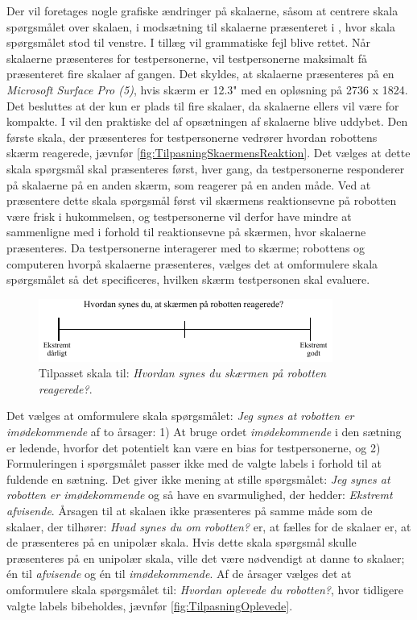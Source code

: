 Der vil foretages nogle grafiske ændringer på skalaerne, såsom at centrere skala spørgsmålet over skalaen, i modsætning til skalaerne præsenteret i , hvor skala spørgsmålet stod til venstre. I tillæg vil grammatiske fejl blive rettet. Når skalaerne præsenteres for testpersonerne, vil testpersonerne maksimalt få præsenteret fire skalaer af gangen. Det skyldes, at skalaerne præsenteres på en \textit{Microsoft Surface Pro (5)}, hvis skærm er 12.3" med en opløsning på 2736 x 1824. Det besluttes at der kun er plads til fire skalaer, da skalaerne ellers vil være for kompakte. I  vil den praktiske del af opsætningen af skalaerne blive uddybet. \blankline 
%
Den første skala, der præsenteres for testpersonerne vedrører hvordan robottens skærm reagerede, jævnfør \autoref{fig:TilpasningSkaermensReaktion}. Det vælges at dette skala spørgsmål skal præsenteres først, hver gang, da testpersonerne responderer på skalaerne på en anden skærm, som reagerer på en anden måde. Ved at præsentere dette skala spørgsmål først vil skærmens reaktionsevne på robotten være frisk i hukommelsen, og testpersonerne vil derfor have mindre at sammenligne med i forhold til reaktionsevne på skærmen, hvor skalaerne præsenteres. Da testpersonerne interagerer med to skærme; robottens og computeren hvorpå skalaerne præsenteres, vælges det at omformulere skala spørgsmålet så det specificeres, hvilken skærm testpersonen skal evaluere.  
%
%
\begin{figure}[H]
\centering
\includegraphics[width =\textwidth]{Figure/TilpasningAfSkalaer/TilpassetSkaermensReaktion} 
\caption{Tilpasset skala til: \textit{Hvordan synes du skærmen på robotten reagerede?}.}
\label{fig:TilpasningSkaermensReaktion}
\end{figure}
\noindent
%
Det vælges at omformulere skala spørgsmålet: \textit{Jeg synes at robotten er imødekommende} af to årsager: 1) At bruge ordet \textit{imødekommende} i den sætning er ledende, hvorfor det potentielt kan være en bias for testpersonerne, og 2) Formuleringen i spørgsmålet passer ikke med de valgte labels i forhold til at fuldende en sætning. Det giver ikke mening at stille spørgsmålet: \textit{Jeg synes at robotten er imødekommende} og så have en svarmulighed, der hedder: \textit{Ekstremt afvisende}. Årsagen til at skalaen ikke præsenteres på samme måde som de skalaer, der tilhører: \textit{Hvad synes du om robotten?} er, at fælles for de skalaer er, at de præsenteres på en unipolær skala. Hvis dette skala spørgsmål skulle præsenteres på en unipolær skala, ville det være nødvendigt at danne to skalaer; én til \textit{afvisende} og én til \textit{imødekommende}. Af de årsager vælges det at omformulere skala spørgsmålet til: \textit{Hvordan oplevede du robotten?}, hvor tidligere valgte labels bibeholdes, jævnfør \autoref{fig:TilpasningOplevede}.
